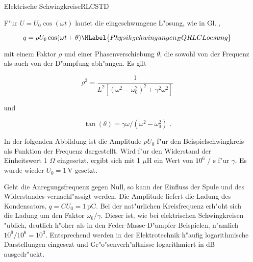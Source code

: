 \begin{MXContent}{Elektrische Schwingkreise}{RLC}{STD}
\begin{MInfo}
F"ur $U=U_0\cos\left(\omega t\right)$ lautet die  eingeschwungene L"osung, wie in Gl. ,

\begin{equation}
  q = \rho U_0 \cos(\omega t + \theta) \MLabel{Physik_Schwingungen_EQRLCLoesung}
\end{equation}

mit einem Faktor $\rho$ und einer Phasenverschiebung $\theta$, die sowohl von der Frequenz als auch von der D"ampfung abh"angen. Es gilt

\begin{equation}
  \rho^2 = \frac{1}{L^2\left[(\omega^2-\omega_0^2)^2+\gamma^2\omega^2\right]}
\end{equation}

und 

\begin{equation}
  \tan\left(\theta\right) = \gamma\omega/(\omega^2-\omega_0^2)\; .
\end{equation}

\end{MInfo}

\begin{MExample}
In der folgenden Abbildung ist die Amplitude $\rho U_0$ f"ur den Beispielschwingkreis als Funktion der Frequenz dargestellt. Wird f"ur den Widerstand der Einheitswert 1 $\Omega$ eingesetzt, ergibt sich mit 1 $\mu$H ein Wert von $10^6$ / s f"ur $\gamma$. Es wurde wieder $U_0=1\,\text{V}$ gesetzt.

\begin{center}
  \end{center}

Geht die Anregungsfrequenz gegen Null, so kann der Einfluss der Spule und des Widerstandes vernachl"assigt werden. Die Amplitude liefert die Ladung des Kondensators, $q = C U_0 = 1\,\text{pC}$. Bei der nat"urlichen Kreisfrequenz erh"oht sich die Ladung um den Faktor $\omega_0/\gamma$. Dieser ist, wie bei elektrischen Schwingkreisen "ublich, deutlich h"oher als in den Feder-Masse-D"ampfer Beispielen, n"amlich $10^9/10^6=10^3$. Entsprechend werden in der Elektrotechnik h"aufig logarithmische Darstellungen eingesezt und Gr"o"senverh"altnisse logarithmiert in dB ausgedr"uckt.


\end{MExample}
\end{MXContent}
